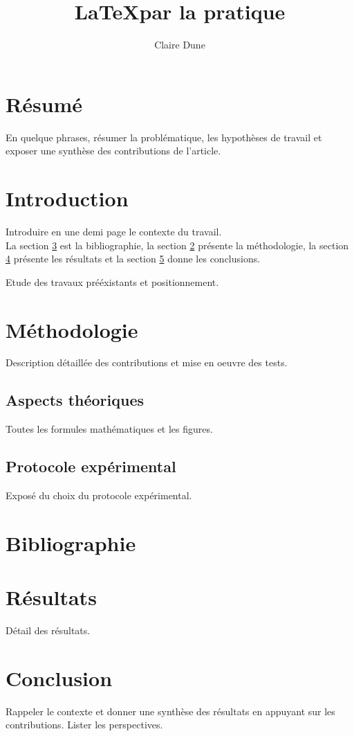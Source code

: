 \documentclass[10pt,a4paper]{article}
\author{Claire Dune}
\title{\LaTeX par la pratique}
\begin{document}
\maketitle
\tableofcontents


\section*{Résumé}
En quelque phrases, résumer la problématique, les hypothèses de travail et exposer une synthèse des contributions de l'article.
\section{Introduction}

Introduire en une demi page le contexte du travail.\\

La section \ref{sec:biblio} est la bibliographie, la section \ref{sec:methodo} présente la méthodologie, la section \ref{sec:resultat} présente les résultats et la section \ref{sec:conclusion} donne les conclusions.



Etude des travaux prééxistants et positionnement.

\section{Méthodologie}
\label{sec:methodo}

Description détaillée des contributions et mise en oeuvre des tests.

\subsection{Aspects théoriques}

Toutes les formules mathématiques et les figures.

\subsection{Protocole expérimental}
Exposé du choix du protocole expérimental.

\section{Bibliographie}
\label{sec:biblio}

\section{Résultats}
\label{sec:resultat}
Détail des résultats.


\section{Conclusion}
\label{sec:conclusion}
Rappeler le contexte et donner une synthèse des résultats en appuyant sur les contributions. Lister les perspectives.
\end{document}
